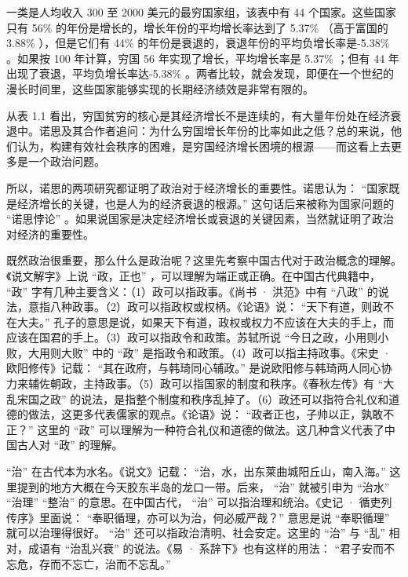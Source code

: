一类是人均收入 300 至 2000 美元的最穷国家组，该表中有 44 个国家。这些国家只有 56\% 的年份是增长的，增长年份的平均增长率达到了 5.37\% （高于富国的 3.88\% ），但是它们有 44\% 的年份是衰退的，衰退年份的平均负增长率是-5.38\% 。如果按 100 年计算，穷国 56 年实现了增长，平均增长率是 5.37\% ；但有 44 年出现了衰退，平均负增长率达-5.38\% 。两者比较，就会发现，即便在一个世纪的漫长时间里，这些国家能够实现的长期经济绩效是非常有限的。

从表 1.1 看出，穷国贫穷的核心是其经济增长不是连续的，有大量年份处在经济衰退中。诺思及其合作者追问：为什么穷国增长年份的比率如此之低？总的来说，他们认为，构建有效社会秩序的困难，是穷国经济增长困境的根源——而这看上去更多是一个政治问题。

所以，诺思的两项研究都证明了政治对于经济增长的重要性。诺思认为： “国家既是经济增长的关键，也是人为的经济衰退的根源。” 这句话后来被称为国家问题的 “诺思悖论” 。如果说国家是决定经济增长或衰退的关键因素，当然就证明了政治对经济的重要性。


既然政治很重要，那么什么是政治呢？这里先考察中国古代对于政治概念的理解。《说文解字》上说 “政，正也” ，可以理解为端正或正确。在中国古代典籍中， “政” 字有几种主要含义：（1）政可以指政事。《尚书 · 洪范》中有 “八政” 的说法，意指八种政事。（2）政可以指政权或权柄。《论语》说： “天下有道，则政不在大夫。” 孔子的意思是说，如果天下有道，政权或权力不应该在大夫的手上，而应该在国君的手上。（3）政可以指政令和政策。苏轼所说 “今日之政，小用则小败，大用则大败” 中的 “政” 是指政令和政策。（4）政可以指主持政事。《宋史 · 欧阳修传》记载： “其在政府，与韩琦同心辅政。” 是说欧阳修与韩琦两人同心协力来辅佐朝政，主持政事。（5）政可以指国家的制度和秩序。《春秋左传》有 “大乱宋国之政” 的说法，是指整个制度和秩序乱掉了。（6）政还可以指符合礼仪和道德的做法，这更多代表儒家的观点。《论语》说： “政者正也，子帅以正，孰敢不正？” 这里的 “政” 可以理解为一种符合礼仪和道德的做法。这几种含义代表了中国古人对 “政” 的理解。

 “治” 在古代本为水名。《说文》记载： “治，水，出东莱曲城阳丘山，南入海。” 这里提到的地方大概在今天胶东半岛的龙口一带。后来， “治” 就被引申为 “治水”  “治理”  “整治” 的意思。在中国古代， “治” 可以指治理和统治。《史记 · 循吏列传序》里面说： “奉职循理，亦可以为治，何必威严哉？” 意思是说 “奉职循理” 就可以治理得很好。 “治” 还可以指政治清明、社会安定。这里的 “治” 与 “乱” 相对，成语有 “治乱兴衰” 的说法。《易 · 系辞下》也有这样的用法： “君子安而不忘危，存而不忘亡，治而不忘乱。” 

